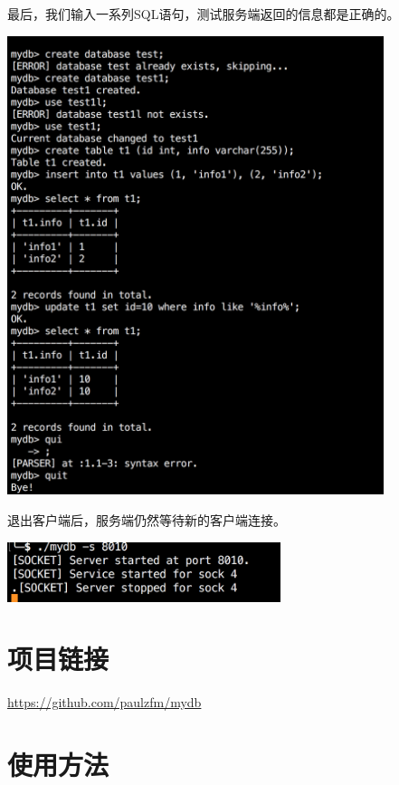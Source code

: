 \documentclass[11pt, a4paper]{article}
\makeatletter
\newcommand\fcaption{\def\@captype{figure}\caption}
\makeatother
\begin{document}
最后，我们输入一系列SQL语句，测试服务端返回的信息都是正确的。

\begin{center}
    \includegraphics[width=11cm]{fig/conn-test}
    \fcaption{远程操作数据库}
\end{center}

退出客户端后，服务端仍然等待新的客户端连接。

\begin{center}
    \includegraphics[width=8cm]{fig/disconn}
    \fcaption{断开连接}
\end{center}

\section{项目链接}

\url{https://github.com/paulzfm/mydb}

\section{使用方法}
\end{document}
